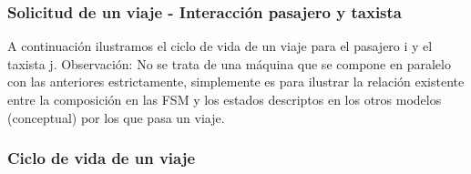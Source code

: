 \subsubsection{Solicitud de un viaje - Interacci\'on pasajero y taxista}

\newpage

A continuación ilustramos el ciclo de vida de un viaje para el pasajero i y el taxista j. Observación: No se trata de una máquina que se compone en paralelo con las anteriores estrictamente, simplemente es para ilustrar la relación existente entre la composición en las FSM y los estados descriptos en los otros modelos (conceptual) por los que pasa un  viaje.


\subsubsection{Ciclo de vida de un viaje}

